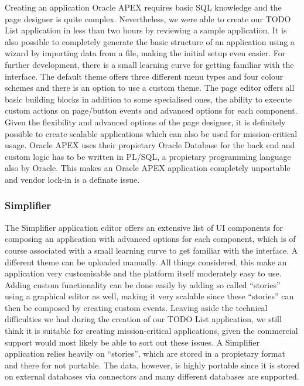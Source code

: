 \documentclass[runningheads]{llncs}
\begin{document}
Creating an application Oracle APEX requires basic SQL knowledge and the page designer is quite complex. Nevertheless, we were able to create our TODO List application in less than two hours by reviewing a sample application. It is also possible to completely generate the basic structure of an application using a wizard by importing data from a file, making the initial setup even easier. For further development, there is a small learning curve for getting familiar with the interface. The default theme offers three different menu types and four colour schemes and there is an option to use a custom theme. The page editor offers all basic building blocks in addition to some specialised ones, the ability to execute custom actions on page/button events and advanced options for each component. Given the flexibility and advanced options of the page designer, it is definitely possible to create scalable applications which can also be used for mission-critical usage. Oracle APEX uses their propietary Oracle Database for the back end and custom logic has to be written in PL/SQL, a propietary programming language also by Oracle. This makes an Oracle APEX application completely unportable and vendor lock-in is a definate issue.

\subsubsection{Simplifier}

The Simplifier application editor offers an extensive list of UI components for composing an application with advanced options for each component, which is of course associated with a small learning curve to get familiar with the interface. A different theme can be uploaded manually. All things considered, this make an application very customisable and the platform itself moderately easy to use. Adding custom functionality can be done easily by adding so called “stories” using a graphical editor as well, making it very scalable since these “stories” can then be composed by creating custom events. Leaving aside the technical difficulties we had during the creation of our TODO List application, we still think it is suitable for creating mission-critical applications, given the commercial support would most likely be able to sort out these issues. A Simplifier application relies heavily on “stories”, which are stored in a propietary format and there for not portable. The data, however, is highly portable since it is stored on external databases via connectors and many different databases are supported.
\end{document}
